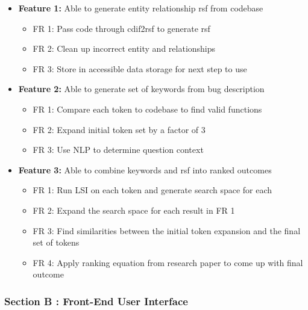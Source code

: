 \documentclass[12pt]{article}
\providecommand{\tightlist}{%
  \setlength{\itemsep}{0pt}\setlength{\parskip}{0pt}}
\begin{document}
\begin{itemize}
\tightlist
\item
  \textbf{Feature 1:} Able to generate entity relationship rsf from
  codebase

  \begin{itemize}
  \tightlist
  \item
    FR 1: Pass code through cdif2rsf to generate rsf
  \item
    FR 2: Clean up incorrect entity and relationships
  \item
    FR 3: Store in accessible data storage for next step to use
  \end{itemize}
\item
  \textbf{Feature 2:} Able to generate set of keywords from bug
  description

  \begin{itemize}
  \tightlist
  \item
    FR 1: Compare each token to codebase to find valid functions
  \item
    FR 2: Expand initial token set by a factor of 3
  \item
    FR 3: Use NLP to determine question context
  \end{itemize}
\item
  \textbf{Feature 3:} Able to combine keywords and rsf into ranked
  outcomes

  \begin{itemize}
  \tightlist
  \item
    FR 1: Run LSI on each token and generate search space for each
  \item
    FR 2: Expand the search space for each result in FR 1
  \item
    FR 3: Find similarities between the initial token expansion and the
    final set of tokens
  \item
    FR 4: Apply ranking equation from research paper to come up with
    final outcome
  \end{itemize}
\end{itemize}

\hypertarget{section-b-front-end-user-interface}{%
\subsubsection{Section B : Front-End User
Interface}\label{section-b-front-end-user-interface}}
\end{document}
